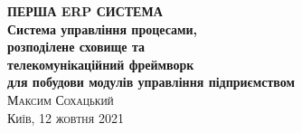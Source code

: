 \frontmatter
\thispagestyle{empty}
\mbox{}\vspace{1in}
\noindent
\begin{flushright}
\vspace{0.5cm}
\textbf{\Huge ПЕРША ERP СИСТЕМА} \\
\vspace{0.5cm}
\textbf{\huge Система управління процесами, \\
        \huge розподілене сховище та \\
        \huge телекомунікаційний фреймворк \\
        \huge для побудови модулів управління підприємством \\
}
\vspace{1em}
\vspace{6cm}
\hfill{\Large\scshape{}Максим Сохацький}
\\
\vspace{0.3cm}
\hfill{\scshape{}Київ, 12 жовтня 2021}
\end{flushright}
\cleartorecto
\tableofcontents*
\mainmatter
